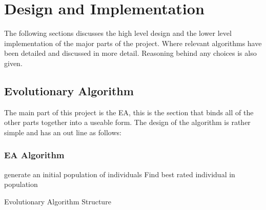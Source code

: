 \documentclass[a4paper]{article}
\begin{document}
\section{Design and Implementation}
The following sections discusses the high level design and the lower level implementation of the major parts of the project.
Where relevant algorithms have been detailed and discussed in more detail.
Reasoning behind any choices is also given.
\par
\subsection{Evolutionary Algorithm}
\par
The main part of this project is the EA, this is the section that binds all of the other parts together into a useable form.
The design of the algorithm is rather simple and has an out line as follows:
\subsubsection{EA Algorithm}
\begin{algorithm}[H]
\SetAlgoLined{}
generate an initial population of individuals\;
Find best rated individual in population\;
\caption{Evolutionary Algorithm Structure}
\end{algorithm}
\end{document}

